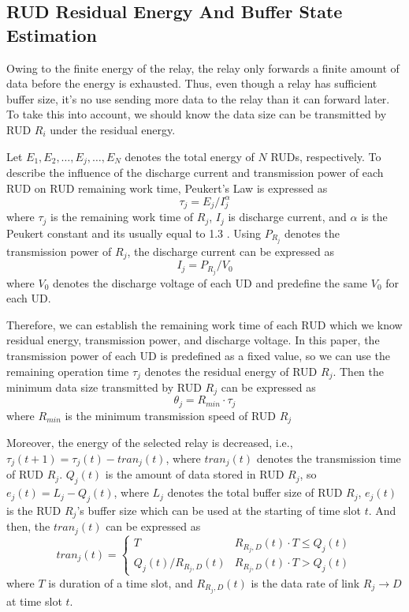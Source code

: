 \documentclass[conference]{IEEEtran}
\begin{document}
\subsection{RUD Residual Energy And Buffer State Estimation}
Owing to the finite energy of the relay, the relay only forwards a finite amount of data before the energy is exhausted. Thus, even though a relay has sufficient buffer size, it's no use sending more data to the relay than it can forward later. To take this into account, we should know the data size can be transmitted by RUD $R_i$ under the residual energy.

Let $E_{1},E_{2},\ldots,E_{j},\ldots,E_{N}$ denotes the total energy of $N$ RUDs, respectively. To describe the influence of the discharge current and transmission power of each RUD on RUD remaining work time, Peukert's Law \cite{6981957} is expressed as
\begin{equation}
\tau_j = E_j/I^{\alpha}_j
\end{equation}
where $\tau_j$ is the remaining work time of $R_j$, $I_j$ is discharge current, and $\alpha$ is the Peukert constant and its usually equal to 1.3 \cite{6981957}. Using $P_{R_j}$ denotes the transmission power of $R_j$, the discharge current can be expressed as
\begin{equation}
I_j = P_{R_j} / V_0
\end{equation}
where $V_0$ denotes the discharge voltage of each UD and predefine the same $V_0$ for each UD.

Therefore, we can establish the remaining work time of each RUD which we know residual energy, transmission power, and discharge voltage. In this paper, the transmission power of each UD is predefined as a fixed value, so we can use the remaining operation time $\tau_j$ denotes the residual energy of RUD $R_j$. Then the minimum data size transmitted by RUD $R_j$ can be expressed as
\begin{equation}
\theta_j = R_{min} \cdot \tau_j
\end{equation}
where $R_{min}$ is the minimum transmission speed of RUD $R_j$

Moreover, the energy of the selected relay is decreased, i.e., $\tau_j(t+1) = \tau_j(t) - tran_j(t)$, where $tran_j(t)$ denotes the transmission time of RUD $R_j$. $Q_j(t)$ is the amount of data stored in RUD $R_j$, so $e_j(t) = L_j -  Q_j(t)$, where $L_j$ denotes the total buffer size of RUD $R_j$, $e_j(t)$ is the RUD $R_j$'s buffer size which can be used at the starting of time slot $t$. And then, the $tran_j(t)$ can be expressed as
\begin{equation}
tran_j(t) = \begin{cases}T & R_{R_j,D}(t)\cdot T \leq Q_j(t)\\Q_j(t)/R_{R_j,D}(t) & R_{R_j,D}(t)\cdot T > Q_j(t)\end{cases}
\end{equation}
where $T$ is duration of a time slot, and $R_{R_j,D}(t)$ is the data rate of link $R_j \rightarrow D$ at time slot $t$.
\end{document}
